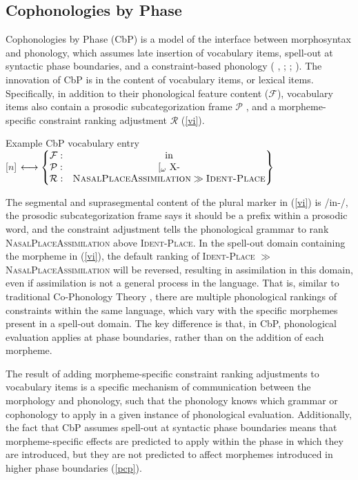 \documentclass[output=paper]{langscibook}
\begin{document}
\subsection{Cophonologies by Phase}\label{sec:F}
Cophonologies by Phase (CbP) is a model of the interface between morphosyntax and phonology, which assumes late insertion of vocabulary items, spell-out at syntactic phase boundaries, and a constraint-based phonology (\citeauthor{Sande:Language} \citeyear{Sande:Language}, \citeyear{Sande:Phonology}; \mbox{\citealt{Sande&Jenks:2018}}; \citealt{Sande:2020}). The innovation of CbP is in the content of vocabulary items, or lexical items. Specifically, in addition to their phonological feature content ($\mathcal{F}$), vocabulary items also contain a prosodic subcategorization frame $\mathcal{P}$ \citep{Inkelas:1990, Paster:2006}, and a morpheme-specific constraint ranking adjustment $\mathcal{R}$ (\ref{vi}).

\ea
Example CbP vocabulary entry\label{vi}\\ 
{[$n$]} $\longleftrightarrow  \begin{Bmatrix}
  \mathcal{F}: & \text{in}  \\
 \mathcal{P}: &   [_{\omega} \ \text{X-}  \\
\mathcal{R}: & \textsc{NasalPlaceAssimilation} \gg \textsc{Ident-Place}\\
 \end{Bmatrix}$
\z

The segmental and suprasegmental content of the plural marker in (\ref{vi}) is /in-/, the prosodic subcategorization frame says it should be a prefix within a prosodic word, and the constraint adjustment tells the phonological grammar to rank \textsc{NasalPlaceAssimilation} above \textsc{Ident-Place}. In the spell-out domain containing the morpheme in (\ref{vi}), the default ranking of \textsc{Ident-Place} $\gg$ \textsc{NasalPlaceAssimilation} will be reversed, resulting in assimilation in this domain, even if assimilation is not a general process in the language. That is, similar to traditional Co-Phonology Theory \citep{Orgun:1996, Anttila:2002, Inkelas&Zoll}, there are multiple phonological rankings of constraints within the same language, which vary with the specific morphemes present in a spell-out domain. The key difference is that, in CbP, phonological evaluation applies at phase boundaries, rather than on the addition of each morpheme.

The result of adding morpheme-specific constraint ranking adjustments to vocabulary items is a specific mechanism of communication between the morphology and phonology, such that the phonology knows which grammar or cophonology to apply in a given instance of phonological evaluation. Additionally, the fact that CbP assumes spell-out at syntactic phase boundaries means that morpheme-specific effects are predicted to apply within the phase in which they are introduced, but they are not predicted to affect morphemes introduced in higher phase boundaries (\ref{pcp}).
\end{document}
